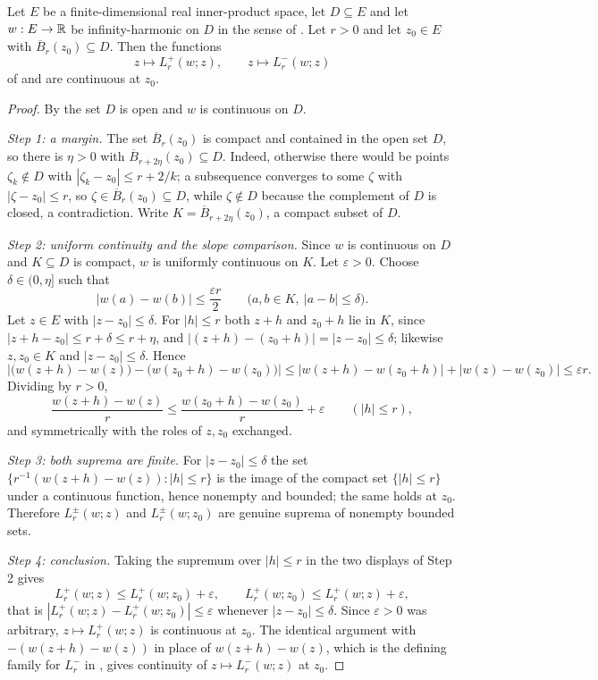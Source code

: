 \begin{lemma}
Let $E$ be a finite-dimensional real inner-product space, let $D\subseteq E$ and
let $w:E\to\mathbb{R}$ be infinity-harmonic on $D$ in the sense of
. Let $r>0$ and let $z_0\in E$ with
$\overline B_r(z_0)\subseteq D$. Then the functions
\[
  z\longmapsto L_r^+(w;z),\qquad z\longmapsto L_r^-(w;z)
\]
of  and  are continuous at
$z_0$.
\end{lemma}
\begin{proof}
By  the set $D$ is open and $w$ is continuous on $D$.

\emph{Step 1: a margin.}
The set $\overline B_r(z_0)$ is compact and contained in the open set $D$, so
there is $\eta>0$ with $\overline B_{r+2\eta}(z_0)\subseteq D$. Indeed,
otherwise there would be points $\zeta_k\notin D$ with
$|\zeta_k-z_0|\le r+2/k$; a subsequence converges to some $\zeta$ with
$|\zeta-z_0|\le r$, so $\zeta\in\overline B_r(z_0)\subseteq D$, while
$\zeta\notin D$ because the complement of $D$ is closed, a contradiction. Write
$K=\overline B_{r+2\eta}(z_0)$, a compact subset of $D$.

\emph{Step 2: uniform continuity and the slope comparison.}
Since $w$ is continuous on $D$ and $K\subseteq D$ is compact, $w$ is uniformly
continuous on $K$. Let $\varepsilon>0$. Choose $\delta\in(0,\eta]$ such that
\[
  |w(a)-w(b)|\le\frac{\varepsilon r}{2}\qquad
  \bigl(a,b\in K,\ |a-b|\le\delta\bigr).
\]
Let $z\in E$ with $|z-z_0|\le\delta$. For $|h|\le r$ both $z+h$ and $z_0+h$ lie
in $K$, since $|z+h-z_0|\le r+\delta\le r+\eta$, and
$|(z+h)-(z_0+h)|=|z-z_0|\le\delta$; likewise $z,z_0\in K$ and
$|z-z_0|\le\delta$. Hence
\[
  \bigl|\bigl(w(z+h)-w(z)\bigr)-\bigl(w(z_0+h)-w(z_0)\bigr)\bigr|
    \le|w(z+h)-w(z_0+h)|+|w(z)-w(z_0)|
    \le\varepsilon r .
\]
Dividing by $r>0$,
\[
  \frac{w(z+h)-w(z)}{r}
    \le\frac{w(z_0+h)-w(z_0)}{r}+\varepsilon
  \qquad(|h|\le r),
\]
and symmetrically with the roles of $z,z_0$ exchanged.

\emph{Step 3: both suprema are finite.}
For $|z-z_0|\le\delta$ the set
$\{r^{-1}(w(z+h)-w(z)):|h|\le r\}$ is the image of the compact set
$\{|h|\le r\}$ under a continuous function, hence nonempty and bounded; the same
holds at $z_0$. Therefore $L_r^\pm(w;z)$ and $L_r^\pm(w;z_0)$ are genuine
suprema of nonempty bounded sets.

\emph{Step 4: conclusion.}
Taking the supremum over $|h|\le r$ in the two displays of Step 2 gives
\[
  L_r^+(w;z)\le L_r^+(w;z_0)+\varepsilon,\qquad
  L_r^+(w;z_0)\le L_r^+(w;z)+\varepsilon,
\]
that is $|L_r^+(w;z)-L_r^+(w;z_0)|\le\varepsilon$ whenever $|z-z_0|\le\delta$.
Since $\varepsilon>0$ was arbitrary, $z\mapsto L_r^+(w;z)$ is continuous at
$z_0$. The identical argument with $-(w(z+h)-w(z))$ in place of
$w(z+h)-w(z)$, which is the defining family for $L_r^-$ in
, gives continuity of $z\mapsto L_r^-(w;z)$ at $z_0$.
\end{proof}
